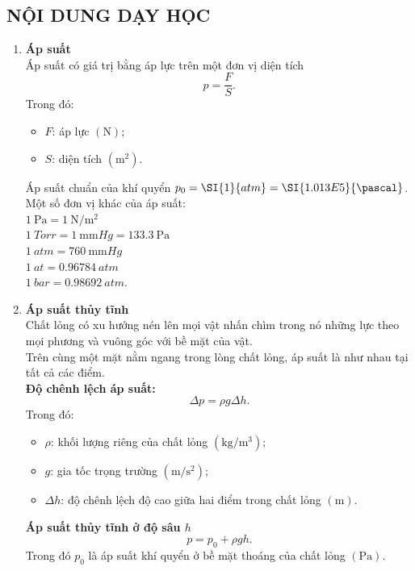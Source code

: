 \subsection{NỘI DUNG DẠY HỌC}
\begin{enumerate}[label=\bfseries\Roman*.]
	\item \textbf{Áp suất}\\
	Áp suất có giá trị bằng áp lực trên một đơn vị diện tích
	$$p=\dfrac{F}{S}.$$
	Trong đó:
	\begin{itemize}
		\item $F$: áp lực $\left(\si{\newton}\right)$;
		\item $S$: diện tích $\left(\si{\meter^2}\right)$.
	\end{itemize}
	Áp suất chuẩn của khí quyển $p_0=\SI{1}{atm}=\SI{1.013E5}{\pascal}$.\\
	Một số đơn vị khác của áp suất:\\
	$\SI{1}{\pascal}=\SI{1}{\newton/\meter^2}$\\
	$\SI{1}{Torr}=\SI{1}{\milli\meter Hg}=\SI{133.3}{\pascal}$\\
	$\SI{1}{atm}=\SI{760}{\milli\meter Hg}$\\
	$\SI{1}{at}=\SI{0.96784}{atm}$\\
	$\SI{1}{bar}=\SI{0.98692}{atm}$.
	\item \textbf{Áp suất thủy tĩnh}\\
	Chất lỏng có xu hướng nén lên mọi vật nhấn chìm trong nó những lực theo mọi phương và vuông góc với bề mặt của vật.\\
	Trên cùng một mặt nằm ngang trong lòng chất lỏng, áp suất là như nhau tại tất cả các điểm.\\
	\textbf{Độ chênh lệch áp suất:}
	$$\Delta p=\rho g\Delta h.$$
	Trong đó:
	\begin{itemize}
		\item $\rho$: khối lượng riêng của chất lỏng $\left(\si{\kilogram/\meter^3}\right)$;
		\item $g$: gia tốc trọng trường $\left(\si{\meter/\second^2}\right)$;
		\item $\Delta h$: độ chênh lệch độ cao giữa hai điểm trong chất lỏng $\left(\si{\meter}\right)$.
	\end{itemize}
	\textbf{Áp suất thủy tĩnh ở độ sâu $h$}
	$$p=p_0+\rho gh.$$
	Trong đó $p_0$ là áp suất khí quyển ở bề mặt thoáng của chất lỏng $\left(\si{\pascal}\right)$.
	
\end{enumerate}
